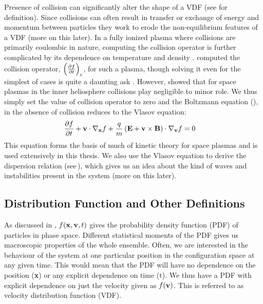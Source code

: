             Presence of collision can significantly alter the shape of a VDF (see  for
            definition). Since collisions can often result in transfer or exchange of energy and
            momentum between particles they work to erode the non-equilibrium features of a VDF
            (more on this later). In a fully ionized plasma where collisions are primarily coulombic
            in nature, computing the collision operator is further complicated by its dependence on
            temperature and density \citep{Baumjohann1996}. \citet{Landau1936} computed the
            collision operator, $\left(\frac{\partial \mathnormal{f}}{\partial t}\right)_{\rm c}$,
            for such a plasma, though solving it even for the simplest of cases is quite a daunting
            ask \citep{Verscharen2019}. However, \citet{Marsch1982, Marsch2010} showed that for
            space plasmas in the inner heliosphere collisions play negligible to minor role. We thus
            simply set the value of collision operator to zero and the Boltzmann equation
            (), in the absence of collision reduces to the Vlasov equation:
            \begin{align}
                \frac{\partial \mathnormal{f}}{\partial t} + \mathbf{v} \cdot \nabla_{\mathbf{x}}\mathnormal{f} + \frac{q}{m}\left(\mathbf{E} + \mathbf{v} \times \mathbf{B}\right) \cdot \nabla_{\mathbf{v}} \mathnormal{f} & = 0 \label{eq:vlas}
            \end{align}
            This equation forms the basis of much of kinetic theory for space plasmas and is used
            extensively in this thesis. We also use the Vlasov equation to derive the dispersion
            relation (see\,), which gives us an idea about the kind of waves and
            instabilities present in the system (more on this later).

        \subsection{Distribution Function and Other Definitions} \label{sec:dfd}

            As discussed in , $\mathnormal{f}(\mathbf{x,v},t)$ gives the probability
            density function (PDF) of particles in phase space. Different statistical moments of the
            PDF gives us macroscopic properties of the whole ensemble. Often, we are interested in
            the behaviour of the system at one particular position in the configuration space at any
            given time. This would mean that the PDF will have no dependence on the position
            (\textbf{x}) or any explicit dependence on time (t). We thus have a PDF with explicit
            dependence on just the velocity given as $\mathnormal{f}(\mathbf{v})$. This is referred
            to as velocity distribution function (VDF). 


